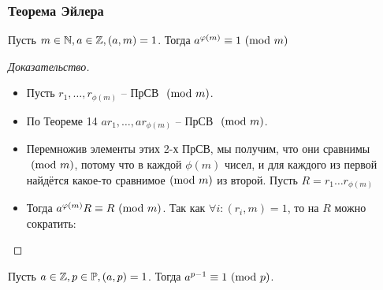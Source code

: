 \begin{frame}[t]
    \frametitle{\bf \normalsize Теорема Эйлера}
    \small
    \setcounter{theorem}{14}
    \begin{theorem}[Эйлера]
        Пусть $m \in \mathbb{N}, a \in \mathbb{Z}, (a,m)=1$. Тогда $a^{\varphi(m)} \equiv 1 \ (\mathrm{mod}\ m)$
    \end{theorem}
    
    \begin{proof}[Доказательство]
        \begin{itemize}
            \item Пусть $r_1, \dots, r_{\phi(m)}$ -- ПрСВ $\ (\mathrm{mod}\ m)$.
            \item По Теореме 14 $ar_1, \dots, ar_{\phi(m)}$ -- ПрСВ $\ (\mathrm{mod}\ m)$.
            \item Перемножив элементы этих 2-х ПрСВ, мы получим, что они сравнимы$\ (\mathrm{mod}\ m)$, потому что в каждой $\phi(m)$ чисел, и для каждого из первой найдётся какое-то сравнимое$\ (\mathrm{mod}\ m)$ из второй. Пусть  $R = r_1 \dots r_{\phi(m)}$ 
            \item Тогда $a^{\varphi(m)}R \equiv R \ (\mathrm{mod}\ m)$. Так как $\forall i: (r_i, m) = 1 $, то на $R$ можно сократить: 
        \end{itemize}
    \end{proof}
    \vspace{-0.7cm}
    \begin{corollary}
        Пусть $a \in \mathbb{Z}, p \in \mathbb{P}, (a, p) = 1$. Тогда $a^{p-1} \equiv 1 \ (\mathrm{mod}\ p)$.
    \end{corollary}
\end{frame}



